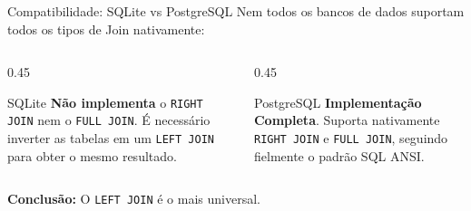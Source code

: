 \documentclass[10pt]{beamer}
\begin{document}
\begin{frame}{Compatibilidade: SQLite vs PostgreSQL}
    Nem todos os bancos de dados suportam todos os tipos de Join nativamente:
    \vspace{1em}
    \begin{columns}
        \begin{column}{0.45\textwidth}
            \begin{exampleblock}{SQLite}
                \textbf{Não implementa} o \texttt{RIGHT JOIN} nem o \texttt{FULL JOIN}. É necessário inverter as tabelas em um \texttt{LEFT JOIN} para obter o mesmo resultado.
            \end{exampleblock}
        \end{column}
        \begin{column}{0.45\textwidth}
            \begin{exampleblock}{PostgreSQL}
                \textbf{Implementação Completa}. Suporta nativamente \texttt{RIGHT JOIN} e \texttt{FULL JOIN}, seguindo fielmente o padrão SQL ANSI.
            \end{exampleblock}
        \end{column}
    \end{columns}
    \vspace{1em}
    \centering
    \small \textbf{Conclusão:} O \texttt{LEFT JOIN} é o mais universal.
\end{frame}
\end{document}
